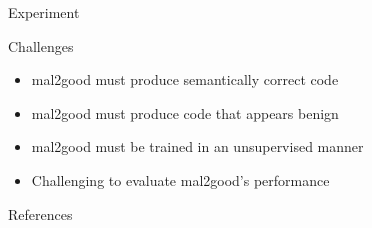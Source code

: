 \documentclass[final,10pt]{beamer}
\newlength{\sepwidth}
\newlength{\colwidth}
\newcommand{\separatorcolumn}{\begin{column}{\sepwidth}\end{column}}
\begin{document}
\begin{frame}[t]
\begin{columns}[t]
\begin{column}{\colwidth}
\begin{block}{Experiment}
	\end{block}
	
	\begin{block}{Challenges}
		
		\begin{itemize}
			\item mal2good must produce semantically correct code
			\item mal2good must produce code that appears benign
			\item mal2good must be trained in an unsupervised manner
			\item Challenging to evaluate mal2good's performance
		\end{itemize}
	
	
	
	\end{block}
	
	\begin{block}{References}
	
		\scriptsize{}
	
	\end{block}

\end{column}

\separatorcolumn
\end{columns}
\end{frame}
\end{document}
